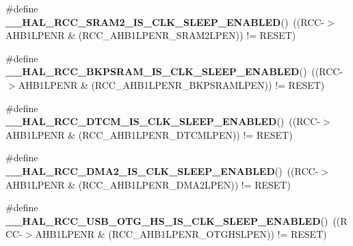 \begin{DoxyCompactItemize}
\item 
\mbox{\label{group___r_c_c___clock___sleep___enable___disable___status_ga39511ffeafa47299604652cb2603e519}} 
\#define {\bfseries \+\_\+\+\_\+\+H\+A\+L\+\_\+\+R\+C\+C\+\_\+\+S\+R\+A\+M2\+\_\+\+I\+S\+\_\+\+C\+L\+K\+\_\+\+S\+L\+E\+E\+P\+\_\+\+E\+N\+A\+B\+L\+ED}()~((R\+CC-\/$>$A\+H\+B1\+L\+P\+E\+NR \& (R\+C\+C\+\_\+\+A\+H\+B1\+L\+P\+E\+N\+R\+\_\+\+S\+R\+A\+M2\+L\+P\+EN)) != R\+E\+S\+ET)
\item 
\mbox{\label{group___r_c_c___clock___sleep___enable___disable___status_ga65777dbcb6c89e0cc94790283c904915}} 
\#define {\bfseries \+\_\+\+\_\+\+H\+A\+L\+\_\+\+R\+C\+C\+\_\+\+B\+K\+P\+S\+R\+A\+M\+\_\+\+I\+S\+\_\+\+C\+L\+K\+\_\+\+S\+L\+E\+E\+P\+\_\+\+E\+N\+A\+B\+L\+ED}()~((R\+CC-\/$>$A\+H\+B1\+L\+P\+E\+NR \& (R\+C\+C\+\_\+\+A\+H\+B1\+L\+P\+E\+N\+R\+\_\+\+B\+K\+P\+S\+R\+A\+M\+L\+P\+EN)) != R\+E\+S\+ET)
\item 
\mbox{\label{group___r_c_c___clock___sleep___enable___disable___status_ga027c46509182e700d0dd1251ad22c3b9}} 
\#define {\bfseries \+\_\+\+\_\+\+H\+A\+L\+\_\+\+R\+C\+C\+\_\+\+D\+T\+C\+M\+\_\+\+I\+S\+\_\+\+C\+L\+K\+\_\+\+S\+L\+E\+E\+P\+\_\+\+E\+N\+A\+B\+L\+ED}()~((R\+CC-\/$>$A\+H\+B1\+L\+P\+E\+NR \& (R\+C\+C\+\_\+\+A\+H\+B1\+L\+P\+E\+N\+R\+\_\+\+D\+T\+C\+M\+L\+P\+EN)) != R\+E\+S\+ET)
\item 
\mbox{\label{group___r_c_c___clock___sleep___enable___disable___status_gaffd54b2e17f88a7dbf9f3d30c728d8f1}} 
\#define {\bfseries \+\_\+\+\_\+\+H\+A\+L\+\_\+\+R\+C\+C\+\_\+\+D\+M\+A2\+\_\+\+I\+S\+\_\+\+C\+L\+K\+\_\+\+S\+L\+E\+E\+P\+\_\+\+E\+N\+A\+B\+L\+ED}()~((R\+CC-\/$>$A\+H\+B1\+L\+P\+E\+NR \& (R\+C\+C\+\_\+\+A\+H\+B1\+L\+P\+E\+N\+R\+\_\+\+D\+M\+A2\+L\+P\+EN)) != R\+E\+S\+ET)
\item 
\mbox{\label{group___r_c_c___clock___sleep___enable___disable___status_ga8d69e2d620f4a3ec7123068d5bf4bc53}} 
\#define {\bfseries \+\_\+\+\_\+\+H\+A\+L\+\_\+\+R\+C\+C\+\_\+\+U\+S\+B\+\_\+\+O\+T\+G\+\_\+\+H\+S\+\_\+\+I\+S\+\_\+\+C\+L\+K\+\_\+\+S\+L\+E\+E\+P\+\_\+\+E\+N\+A\+B\+L\+ED}()~((R\+CC-\/$>$A\+H\+B1\+L\+P\+E\+NR \& (R\+C\+C\+\_\+\+A\+H\+B1\+L\+P\+E\+N\+R\+\_\+\+O\+T\+G\+H\+S\+L\+P\+EN)) != R\+E\+S\+ET)

\end{DoxyCompactItemize}
